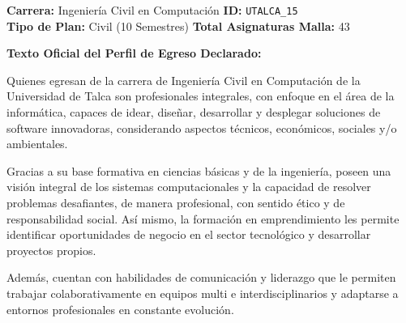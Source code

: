 \documentclass[11pt,a4paper]{article}
\begin{document}
\begin{tcolorbox}[fichaStyle, title={UNIVERSIDAD 15: Universidad de Talca (UTALCA)}]
\small\sffamily
\textbf{Carrera:} Ingeniería Civil en Computación \hfill \textbf{ID:} \texttt{UTALCA\_15} \\
\textbf{Tipo de Plan:} Civil (10 Semestres) \hfill \textbf{Total Asignaturas Malla:} 43

\tcbline

\textbf{Texto Oficial del Perfil de Egreso Declarado:}\\[4pt]
{\small\rmfamily
Quienes egresan de la carrera de Ingeniería Civil en Computación de la Universidad de Talca son profesionales integrales, con enfoque en el área de la informática, capaces de idear, diseñar, desarrollar y desplegar soluciones de software innovadoras, considerando aspectos técnicos, económicos, sociales y/o ambientales.

\vspace{4pt}
Gracias a su base formativa en ciencias básicas y de la ingeniería, poseen una visión integral de los sistemas computacionales y la capacidad de resolver problemas desafiantes, de manera profesional, con sentido ético y de responsabilidad social. Así mismo, la formación en emprendimiento les permite identificar oportunidades de negocio en el sector tecnológico y desarrollar proyectos propios.

\vspace{4pt}
Además, cuentan con habilidades de comunicación y liderazgo que le permiten trabajar colaborativamente en equipos multi e interdisciplinarios y adaptarse a entornos profesionales en constante evolución.
}
\end{tcolorbox}

\newpage
\end{document}
